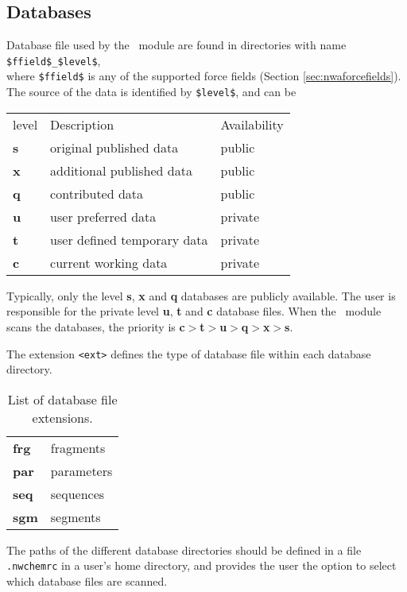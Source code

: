 \subsection{Databases}
Database file used by the \prepare\ module are found in directories 
with name \verb+$ffield$_$level$+, \\
where \verb+$ffield$+ is any of the
supported force fields (Section \ref{sec:nwaforcefields}). 
The source of the data is identified by \verb+$level$+, and can be 
\begin{center}
\begin{tabular}{lll}
\hline
level   & Description                 & Availability \\
{\bf s} & original published data     & public       \\
{\bf x} & additional published data   & public       \\
{\bf q} & contributed data            & public       \\
{\bf u} & user preferred data         & private      \\
{\bf t} & user defined temporary data & private      \\
{\bf c} & current working data        & private      \\
\hline
\end{tabular}
\end{center}

Typically, only the level {\bf s}, {\bf x} and {\bf q} databases are publicly 
available. 
The user is responsible for the private level {\bf u}, {\bf t} and {\bf c}
database files. When the \prepare\ module scans the databases, the priority
is {\bf c}$>${\bf t}$>${\bf u}$>${\bf q}$>${\bf x}$>${\bf s}.

The extension \verb+<ext>+ defines the type of database file within each
database directory. 
\begin{table}[htbp]
\begin{center}
\begin{tabular}{ll}
{\bf frg} & fragments\\
{\bf par} & parameters\\
{\bf seq} & sequences\\
{\bf sgm} & segments\\
\end{tabular}
\end{center}
\caption{List of database file extensions.}
\end{table}


The paths of the different database directories should be defined in a file 
{\tt .nwchemrc} in a user's home directory, and provides the user the
option to select which database files are scanned.

